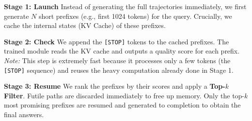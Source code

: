 \documentclass[11pt]{article}
\theoremstyle{plain}
\newcommand{\tx}[1]{[\textcolor{cyan}{tx: #1}]}
\begin{document}
\textbf{Stage 1: Launch}
Instead of generating the full trajectories immediately, we first generate $N$ short prefixes (e.g., first 1024 tokens) for the query.
Crucially, we cache the internal states (KV Cache) of these prefixes.

\textbf{Stage 2: Check}
We append the \texttt{[STOP]} tokens to the cached prefixes.
The trained module reads the KV cache and outputs a quality score for each prefix.
\textit{Note:} This step is extremely fast because it processes only a few tokens (the \texttt{[STOP]} sequence) and reuses the heavy computation already done in Stage 1.

\textbf{Stage 3: Resume}
We rank the prefixes by their scores and apply a \textbf{Top-$k$ Filter}.
Futile paths are discarded immediately to free up memory.
Only the top-$k$ most promising prefixes are resumed and generated to completion to obtain the final answers.



\end{document}
